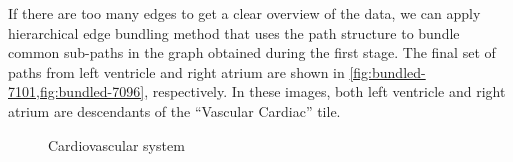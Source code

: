 If there are too many edges to get a clear overview of the data, we can apply hierarchical edge bundling method that uses the path structure to bundle common sub-paths in the graph obtained during the first stage. The final set of paths from left ventricle and right atrium are shown in \cref{fig:bundled-7101,fig:bundled-7096}, respectively. In these images, both left ventricle and right atrium are descendants of the ``Vascular Cardiac'' tile.
\begin{figure}%
  \centering%
  \caption{Cardiovascular system}
  \label{fig:vascular-connectivity}
\end{figure}


